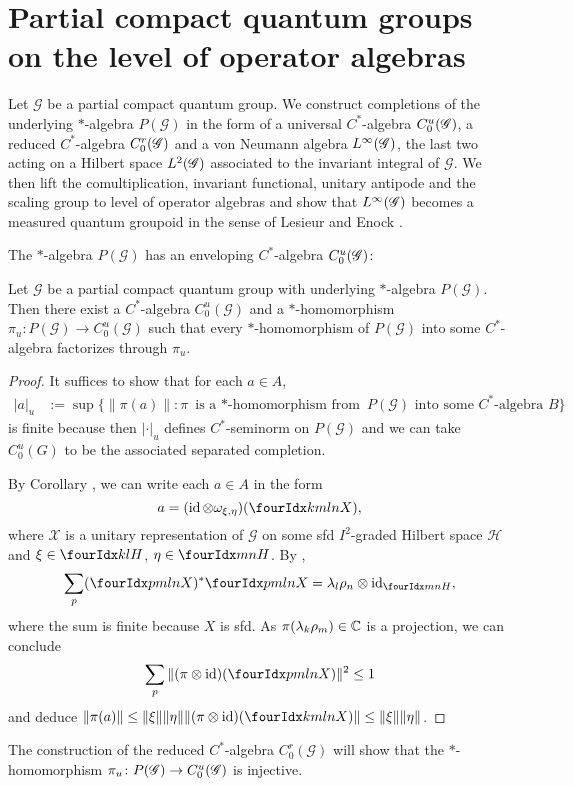 \section{Partial compact quantum groups on the level of operator algebras}


Let $\mathscr{G}$ be a partial compact quantum group. We construct
completions of the underlying $*$-algebra $P(\mathscr{G})$ in the form
of a universal $C^{*}$-algebra $C^{u}_{0}(\mathscr{G})$, a reduced $C^{*}$-algebra
$C^{r}_{0}(\mathscr{G})$ and a von Neumann algebra $L^{\infty}(\mathscr{G})$, the last two acting on a
Hilbert space $L^{2}(\mathscr{G})$ associated to the invariant integral of
$\mathscr{G}$.  We then lift the comultiplication, invariant
functional, unitary antipode and the scaling group to level of
operator algebras and show that $L^{\infty}(\mathscr{G})$ becomes a measured quantum
groupoid in the sense of Lesieur \cite{Les1} and Enock \cite{Eno2}.

The $*$-algebra $P(\mathscr{G})$ has an enveloping $C^{*}$-algebra $C^{u}_{0}(\mathscr{G})$:
\begin{Prop}
Let $\mathscr{G}$ be a partial compact quantum group with underlying
$*$-algebra $P(\mathscr{G})$. Then
  there exist a $C^{*}$-algebra $C^{u}_{0}(\mathscr{G})$ and a
  $*$-homomorphism $\pi_{u} \colon P(\mathscr{G}) \to
  C^{u}_{0}(\mathscr{G})$ such that every $*$-homomorphism of
  $P(\mathscr{G})$ into some $C^{*}$-algebra factorizes through
  $\pi_{u}$.
\end{Prop}
\begin{proof}
It suffices to show that for each $a \in A$,
\begin{align*} 
  |a|_{u}&:= \sup \{ \|\pi(a)\| : \pi \text{ is a $*$-homomorphism from } P(\mathscr{G})
  \text{ into some $C^{*}$-algebra } B\}
\end{align*}
is finite because then $|\cdot |_{u}$ defines $C^{*}$-seminorm on
$P(\mathscr{G})$ and we can take $C^{u}_{0}(G)$ to be the associated
separated completion.


By Corollary \cite[Proposition 3.31]{DCT1}, we can write each $a\in A$
in the form \[a=(\id \otimes \omega_{\xi,\eta})(\Gr{X}{k}{l}{m}{n}),\]
where $\mathscr{X}$ is a unitary representation of
$\mathscr{G}$ on some sfd $I^{2}$-graded Hilbert space
$\mathcal{H}$ and $\xi\in \Gru{H}{k}{l}$, $\eta\in
\Gru{H}{m}{n}$.  By \cite[Lemma 3.12]{DCT1},
  \begin{align*}
    \sum_{p}(\Gr{X}{p}{l}{m}{n})^{*} \Gr{X}{p}{l}{m}{n}  = \lambda_{l}\rho_{n}
    \otimes \id_{\Gru{H}{m}{n}},
  \end{align*}
where  the sum is  finite because $X$ is sfd. As
  $\pi(\lambda_{k}\rho_{m})\in \mathbb{C}$ is a projection, we can conclude
  \begin{align} \label{eq:corep-estimate}
    \sum_{p} \| (\pi \otimes \id)(\Gr{X}{p}{l}{m}{n})\|^{2} \leq 1
  \end{align}
  and deduce $\|\pi(a)\| \leq \| \xi\| \|\eta\| \|(\pi \otimes \id)(\Gr{X}{k}{l}{m}{n})\| \leq
    \|\xi\|\|\eta\| $. 
\end{proof}
The construction of the reduced $C^{*}$-algebra
$C^{r}_{0}(\mathscr{G})$ will show that the $*$-homomorphism $\pi_{u}
\colon P(\mathscr{G}) \to C^{u}_{0}(\mathscr{G})$ is injective.

